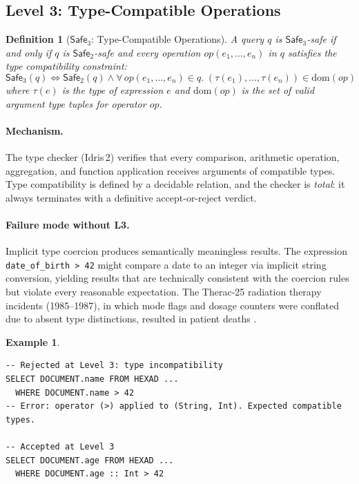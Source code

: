 \documentclass[11pt,a4paper]{article}
\newtheorem{definition}[theorem]{Definition}
\newtheorem{example}[theorem]{Example}
\newcommand{\LevelN}[1]{\textsf{L#1}}
\newcommand{\Safe}[1]{\ensuremath{\mathsf{Safe}_{#1}}}
\begin{document}
\subsection{Level 3: Type-Compatible Operations}\label{sec:L3}

\begin{definition}[\Safe{3}: Type-Compatible Operations]
A query $q$ is \Safe{3}-safe if and only if $q$ is \Safe{2}-safe and
every operation $\mathit{op}(e_1, \ldots, e_n)$ in $q$ satisfies the
type compatibility constraint:
\[
  \Safe{3}(q) \iff \Safe{2}(q) \land
  \forall\, \mathit{op}(e_1, \ldots, e_n) \in q.\;
  (\tau(e_1), \ldots, \tau(e_n)) \in \mathrm{dom}(\mathit{op})
\]
where $\tau(e)$ is the type of expression $e$ and $\mathrm{dom}(\mathit{op})$
is the set of valid argument type tuples for operator $\mathit{op}$.
\end{definition}

\paragraph{Mechanism.}
The type checker (Idris\,2) verifies that every comparison, arithmetic
operation, aggregation, and function application receives arguments
of compatible types.  Type compatibility is defined by a decidable
relation, and the checker is \emph{total}: it always terminates with
a definitive accept-or-reject verdict.

\paragraph{Failure mode without \LevelN{3}.}
Implicit type coercion produces semantically meaningless results.  The
expression \texttt{date\_of\_birth > 42} might compare a date to an
integer via implicit string conversion, yielding results that are
technically consistent with the coercion rules but violate every
reasonable expectation.  The Therac-25 radiation therapy incidents
(1985--1987), in which mode flags and dosage counters were conflated
due to absent type distinctions, resulted in patient deaths
\citep{leveson1993therac}.

\begin{example}
\begin{lstlisting}[language=VCL]
-- Rejected at Level 3: type incompatibility
SELECT DOCUMENT.name FROM HEXAD ...
  WHERE DOCUMENT.name > 42
-- Error: operator (>) applied to (String, Int). Expected compatible types.

-- Accepted at Level 3
SELECT DOCUMENT.age FROM HEXAD ...
  WHERE DOCUMENT.age :: Int > 42
\end{lstlisting}
\end{example}
\end{document}
